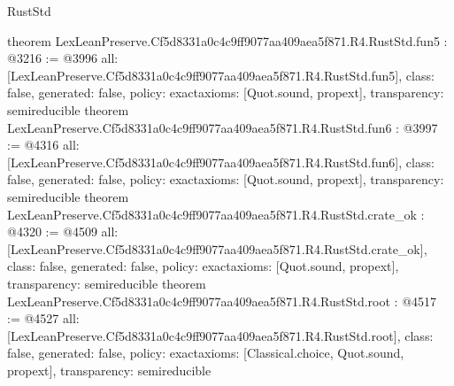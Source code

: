 \begin{lexlean}{RustStd}
\begin{coremodule}
{}
theorem LexLeanPreserve.Cf5d8331a0c4c9ff9077aa409aea5f871.R4.RustStd.fun5 : @3216 := @3996 {
  all: [LexLeanPreserve.Cf5d8331a0c4c9ff9077aa409aea5f871.R4.RustStd.fun5],
  class: false,
  generated: false,
  policy: exact{axioms: [Quot.sound, propext]},
  transparency: semireducible
}
theorem LexLeanPreserve.Cf5d8331a0c4c9ff9077aa409aea5f871.R4.RustStd.fun6 : @3997 := @4316 {
  all: [LexLeanPreserve.Cf5d8331a0c4c9ff9077aa409aea5f871.R4.RustStd.fun6],
  class: false,
  generated: false,
  policy: exact{axioms: [Quot.sound, propext]},
  transparency: semireducible
}
theorem LexLeanPreserve.Cf5d8331a0c4c9ff9077aa409aea5f871.R4.RustStd.crate_ok : @4320 := @4509 {
  all: [LexLeanPreserve.Cf5d8331a0c4c9ff9077aa409aea5f871.R4.RustStd.crate_ok],
  class: false,
  generated: false,
  policy: exact{axioms: [Quot.sound, propext]},
  transparency: semireducible
}
theorem LexLeanPreserve.Cf5d8331a0c4c9ff9077aa409aea5f871.R4.RustStd.root : @4517 := @4527 {
  all: [LexLeanPreserve.Cf5d8331a0c4c9ff9077aa409aea5f871.R4.RustStd.root],
  class: false,
  generated: false,
  policy: exact{axioms: [Classical.choice, Quot.sound, propext]},
  transparency: semireducible
}


\end{coremodule}
\end{lexlean}
